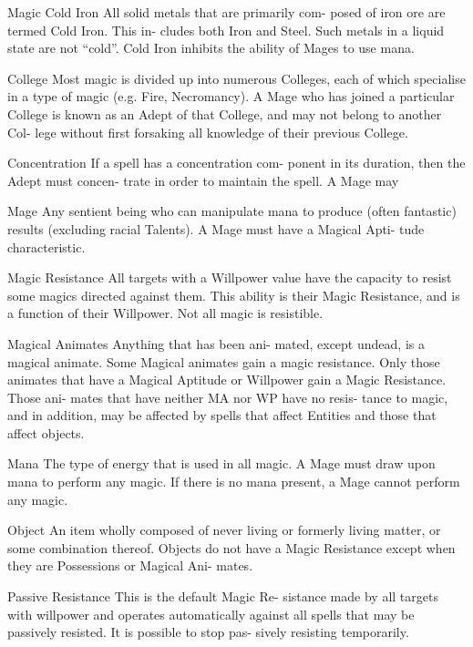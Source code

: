 \begin{Chapter}{Magic}
Cold Iron All solid metals that are primarily com-
posed  of  iron  ore  are  termed  Cold  Iron.  This  in-
cludes both Iron and Steel. Such metals in a liquid 
state are not “cold”. Cold Iron inhibits the ability of 
Mages to use mana. 

College  Most  magic  is  divided  up  into  numerous 
Colleges,  each  of  which  specialise  in  a  type  of 
magic  (e.g.  Fire,  Necromancy).  A  Mage  who  has 
joined a particular College is known as an Adept of 
that  College,  and  may  not  belong  to  another  Col-
lege  without  first  forsaking  all  knowledge  of  their 
previous College. 

Concentration If a spell has a concentration com-
ponent in its duration, then the Adept must concen-
trate  in  order  to  maintain  the  spell.  A  Mage  may 

Mage  Any  sentient  being  who  can  manipulate 
mana to produce (often fantastic) results (excluding 
racial Talents). A Mage must have a Magical Apti-
tude characteristic. 

Magic  Resistance  All  targets  with  a  Willpower 
value  have  the  capacity  to  resist  some  magics 
directed  against  them.  This  ability  is  their  Magic 
Resistance,  and  is  a  function  of  their  Willpower. 
Not all magic is resistible. 

Magical  Animates  Anything  that  has  been  ani-
mated, except undead, is a magical animate. Some 
Magical  animates  gain  a  magic  resistance.  Only 
those  animates  that  have  a  Magical  Aptitude  or 
Willpower  gain  a  Magic  Resistance.  Those  ani-
mates that have neither MA nor WP have no resis-
tance to magic, and in addition, may be affected by 
spells  that  affect  Entities  and  those  that  affect 
objects. 

Mana The type of energy that is used in all magic. 
A  Mage  must  draw  upon  mana  to  perform  any 
magic.  If there is no mana present, a Mage cannot 
perform any magic. 

Object  An  item  wholly  composed  of  never  living 
or  formerly  living  matter,  or  some  combination 
thereof.  Objects  do  not  have  a  Magic  Resistance 
except when they are Possessions or Magical Ani-
mates. 

Passive  Resistance  This  is  the  default  Magic  Re-
sistance  made  by  all  targets  with  willpower  and 
operates  automatically  against  all  spells  that  may 
be  passively  resisted.  It  is  possible  to  stop  pas-
sively resisting temporarily. 


\end{Chapter}
